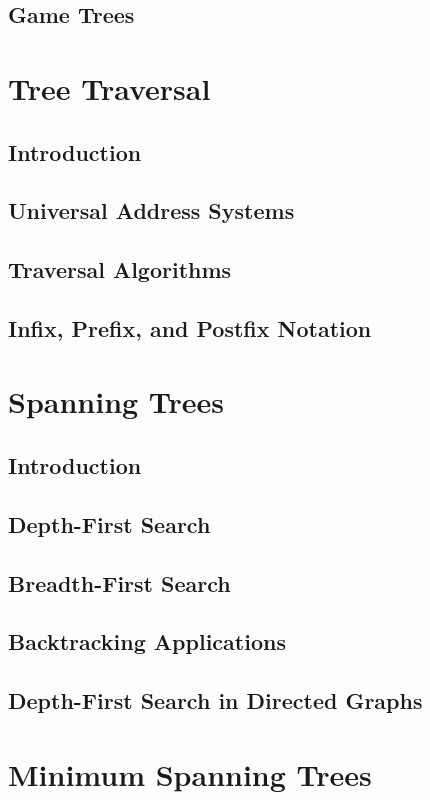 \documentclass[11pt]{book}
\begin{document}
  \subsection{Game Trees}
  
 \section{Tree Traversal}
  \subsection{Introduction}
  \subsection{Universal Address Systems}
  \subsection{Traversal Algorithms}
  \subsection{Infix, Prefix, and Postfix Notation}
  
 \section{Spanning Trees}
  \subsection{Introduction}
  \subsection{Depth-First Search}
  \subsection{Breadth-First Search}
  \subsection{Backtracking Applications}
  \subsection{Depth-First Search in Directed Graphs}
  
 \section{Minimum Spanning Trees}
\end{document}
